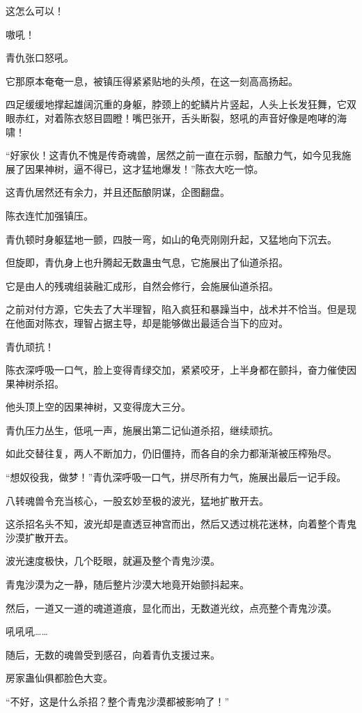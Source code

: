 \begin{this_body}
这怎么可以！

嗷吼！

青仇张口怒吼。

它那原本奄奄一息，被镇压得紧紧贴地的头颅，在这一刻高高扬起。

四足缓缓地撑起雄阔沉重的身躯，脖颈上的蛇鳞片片竖起，人头上长发狂舞，它双眼赤红，对着陈衣怒目圆瞪！嘴巴张开，舌头断裂，怒吼的声音好像是咆哮的海啸！

“好家伙！这青仇不愧是传奇魂兽，居然之前一直在示弱，酝酿力气，如今见我施展了因果神树，逼不得已，这才猛地爆发！”陈衣大吃一惊。

这青仇居然还有余力，并且还酝酿阴谋，企图翻盘。

陈衣连忙加强镇压。

青仇顿时身躯猛地一颤，四肢一弯，如山的龟壳刚刚升起，又猛地向下沉去。

但旋即，青仇身上也升腾起无数蛊虫气息，它施展出了仙道杀招。

它是由人的残魂组装融汇成形，自然会修行，会施展仙道杀招。

之前对付方源，它失去了大半理智，陷入疯狂和暴躁当中，战术并不恰当。但是现在他面对陈衣，理智占据主导，却是能够做出最适合当下的应对。

青仇顽抗！

陈衣深呼吸一口气，脸上变得青绿交加，紧紧咬牙，上半身都在颤抖，奋力催使因果神树杀招。

他头顶上空的因果神树，又变得庞大三分。

青仇压力丛生，低吼一声，施展出第二记仙道杀招，继续顽抗。

如此交替往复，两人不断加力，仍旧僵持，而各自的余力都渐渐被压榨殆尽。

“想奴役我，做梦！”青仇深呼吸一口气，拼尽所有力气，施展出最后一记手段。

八转魂兽令充当核心，一股玄妙至极的波光，猛地扩散开去。

这杀招名头不知，波光却是直透豆神宫而出，然后又透过桃花迷林，向着整个青鬼沙漠扩散开去。

波光速度极快，几个眨眼，就遍及整个青鬼沙漠。

青鬼沙漠为之一静，随后整片沙漠大地竟开始颤抖起来。

然后，一道又一道的魂道道痕，显化而出，无数道光纹，点亮整个青鬼沙漠。

吼吼吼……

随后，无数的魂兽受到感召，向着青仇支援过来。

房家蛊仙俱都脸色大变。

“不好，这是什么杀招？整个青鬼沙漠都被影响了！”


\end{this_body}
